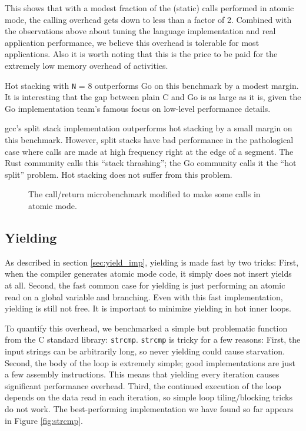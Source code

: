 \documentclass[a4paper,UKenglish,cleveref, autoref]{lipics-v2019}
\begin{document}
This shows that with a modest fraction of the (static) calls performed in atomic mode, the calling overhead gets down to less than a factor of 2.
Combined with the observations above about tuning the language implementation and real application performance, we believe this overhead is tolerable for most applications.
Also it is worth noting that this is the price to be paid for the extremely low memory overhead of activities.

Hot stacking with \texttt{N} = 8 outperforms Go on this benchmark by a modest margin.
It is interesting that the gap between plain C and Go is as large as it is, given the Go implementation team's famous focus on low-level performance details.

gcc's split stack implementation outperforms hot stacking by a small margin on this benchmark.
However, split stacks have bad performance in the pathological case where calls are made at high frequency right at the edge of a segment.
The Rust community calls this ``stack thrashing''; the Go community calls it the ``hot split'' problem.
Hot stacking does not suffer from this problem.

\begin{figure}
\caption{The call/return microbenchmark modified to make some calls in atomic mode.}
\label{fig:micro_calling_n}
\end{figure}

\subsection{Yielding}

As described in section \ref{sec:yield_imp}, yielding is made fast by two tricks:
First, when the compiler generates atomic mode code, it simply does not insert yields at all.
Second, the fast common case for yielding is just performing an atomic read on a global variable and branching.
Even with this fast implementation, yielding is still not free.
It is important to minimize yielding in hot inner loops.

To quantify this overhead, we benchmarked a simple but problematic function from the C standard library: \texttt{strcmp}.
\texttt{strcmp} is tricky for a few reasons:
First, the input strings can be arbitrarily long, so never yielding could cause starvation.
Second, the body of the loop is extremely simple; good implementations are just a few assembly instructions.
This means that yielding every iteration causes significant performance overhead.
Third, the continued execution of the loop depends on the data read in each iteration, so simple loop tiling/blocking tricks do not work.
The best-performing implementation we have found so far appears in Figure \ref{fig:strcmp}.
\end{document}
